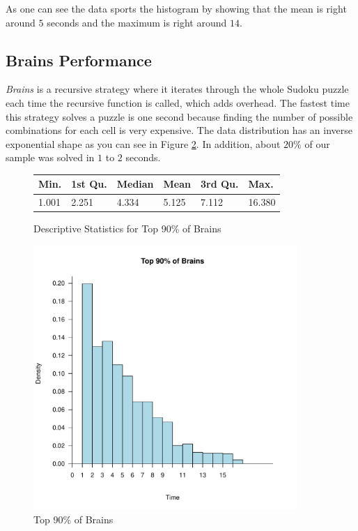 \documentclass[letterpaper]{article}
\begin{document}
As one can see the data sports the histogram by showing that the mean is right around $5$ seconds and the maximum is right around $14$.

\subsection{Brains Performance}

\emph{Brains} is a recursive strategy where it iterates through the whole Sudoku puzzle each time the recursive function is called, which adds overhead. The fastest time this strategy solves a puzzle is one second because finding the number of possible combinations for each cell is very expensive. The data distribution has an inverse exponential shape as you can see in Figure \ref{fig: 90_perc_brains_dist}. In addition, about $20\%$ of our sample was solved in $1$ to $2$ seconds.

\begin{figure}[h]
	\centering
	\begin{tabular}{|l|l|l|l|l|l|}
		\hline
		Min. & 1st Qu.  & Median & Mean & 3rd Qu. & Max.\\
		\hline
		  1.001  & 2.251 &  4.334  & 5.125 & 7.112 & 16.380\\
		\hline
	\end{tabular}
	\caption{Descriptive Statistics for Top 90\% of Brains}
	\label{fig: 90_perc_brains_table}
\end{figure}

\begin{figure}[h]
	\centering
	\includegraphics[width=100mm]{../stats/Top90Brains.pdf}
	\caption{Top 90\% of Brains}
	\label{fig: 90_perc_brains_dist}
\end{figure}
\end{document}
